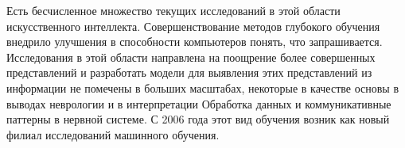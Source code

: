\begin{frame}

    Есть бесчисленное множество текущих исследований в этой области искусственного интеллекта.
    Совершенствование методов глубокого обучения внедрило улучшения в способности компьютеров понять, что запрашивается.
    Исследования в этой области направлена на поощрение более совершенных представлений и
    разработать модели для выявления этих представлений из информации не помечены в больших масштабах,
    некоторые в качестве основы в выводах неврологии и в интерпретации Обработка данных и
    коммуникативные паттерны в нервной системе.
    С 2006 года этот вид обучения возник как новый филиал исследований машинного обучения.

\end{frame}